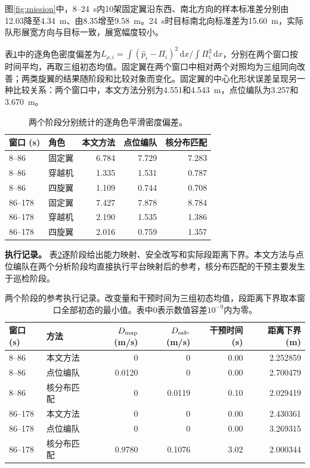 \documentclass[UTF8,a4paper,11pt,fontset=none]{ctexart}
\begin{document}
图\ref{fig:mission}中，8--24~s内10架固定翼沿东西、南北方向的样本标准差分别由12.03降至4.34~m、由8.35增至9.58~m。24~s时目标南北向标准差为15.60~m，实际队形展宽方向与目标一致，展宽幅度较小。

表\ref{tab:role-density-stages}中的逐角色密度偏差为$L_{\rho,i}=\int(\widehat p_i-\Pi_i)^2\,\mathrm dx/\int\Pi_i^2\,\mathrm dx$，分别在两个窗口按时间平均，再取三组初态均值。固定翼在两个窗口中相对两个对照均为三组同向改善；两类旋翼的结果随阶段和比较对象而变化。固定翼的中心化形状误差呈现另一种比较关系：两个窗口中，本文方法分别为4.551和4.543~m，点位编队为3.257和3.670~m。

\begin{table}[htbp]\centering\small
\caption{两个阶段分别统计的逐角色平滑密度偏差。}\label{tab:role-density-stages}
\begin{tabular}{llrrr}\toprule
窗口 (s) & 角色 & 本文方法 & 点位编队 & 核分布匹配\\\midrule
8--86 & 固定翼 & 6.784 & 7.729 & 7.283\\
8--86 & 穿越机 & 1.335 & 1.531 & 0.787\\
8--86 & 四旋翼 & 1.109 & 0.744 & 0.708\\
\midrule
86--178 & 固定翼 & 7.427 & 7.878 & 8.784\\
86--178 & 穿越机 & 2.190 & 1.535 & 1.386\\
86--178 & 四旋翼 & 2.016 & 0.759 & 1.357\\
\bottomrule\end{tabular}\end{table}

\noindent\textbf{执行记录。}\label{app:execution-statistics}
表\ref{tab:phase-execution}逐阶段给出能力映射、安全改写和实际段距离下界。本文方法与点位编队在两个分析阶段均直接执行平台映射后的参考，核分布匹配的干预主要发生于巡检阶段。

\begin{table}[htbp]\centering\small
\caption{两个阶段的参考执行记录。改变量和干预时间为三组初态均值，段距离下界取本窗口全部初态的最小值。表中0表示数值容差$10^{-9}$内为零。}\label{tab:phase-execution}
\setlength{\tabcolsep}{4pt}
\begin{tabular}{llrrrr}\toprule
窗口 (s) & 方法 & $D_{\rm map}$ (m/s) & $D_{\rm safe}$ (m/s) & 干预时间 (s) & 距离下界 (m)\\\midrule
8--86 & 本文方法 & 0 & 0 & 0.00 & 2.252859\\
8--86 & 点位编队 & 0.0120 & 0 & 0.00 & 2.700479\\
8--86 & 核分布匹配 & 0 & 0.0119 & 0.10 & 2.029419\\
\midrule
86--178 & 本文方法 & 0 & 0 & 0.00 & 2.430361\\
86--178 & 点位编队 & 0 & 0 & 0.00 & 3.269315\\
86--178 & 核分布匹配 & 0.9780 & 0.1076 & 3.02 & 2.000344\\
\bottomrule\end{tabular}\end{table}
\end{document}
